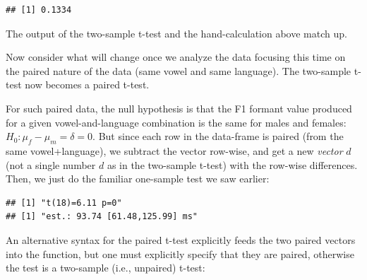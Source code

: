 \documentclass[
  12pt,
]{krantz}
\newenvironment{Shaded}{\begin{snugshade}}{\end{snugshade}}
\newcommand{\AttributeTok}[1]{\textcolor[rgb]{0.77,0.63,0.00}{#1}}
\newcommand{\ConstantTok}[1]{\textcolor[rgb]{0.00,0.00,0.00}{#1}}
\newcommand{\FunctionTok}[1]{\textcolor[rgb]{0.00,0.00,0.00}{#1}}
\newcommand{\NormalTok}[1]{#1}
\newcommand{\OtherTok}[1]{\textcolor[rgb]{0.56,0.35,0.01}{#1}}
\newcommand{\SpecialCharTok}[1]{\textcolor[rgb]{0.00,0.00,0.00}{#1}}
\theoremstyle{definition}
\theoremstyle{definition}
\theoremstyle{definition}
\theoremstyle{definition}
\theoremstyle{remark}
\begin{document}
\begin{verbatim}
## [1] 0.1334
\end{verbatim}

The output of the two-sample t-test and the hand-calculation above match up.

Now consider what will change once we analyze the data focusing this time on the paired nature of the data (same vowel and same language). The two-sample t-test now becomes a paired t-test.

For such paired data, the null hypothesis is that the F1 formant value produced for a given vowel-and-language combination is the same for males and females: \(H_0: \mu_f-\mu_m=\delta=0\). But since each row in the data-frame is paired (from the same vowel+language), we subtract the vector row-wise, and get a new \emph{vector} \(d\) (not a single number \(d\) as in the two-sample t-test) with the row-wise differences. Then, we just do the familiar one-sample test we saw earlier:

\begin{Shaded}
\end{Shaded}

\begin{verbatim}
## [1] "t(18)=6.11 p=0"
## [1] "est.: 93.74 [61.48,125.99] ms"
\end{verbatim}

An alternative syntax for the paired t-test explicitly feeds the two paired vectors into the function, but one must explicitly specify that they are paired, otherwise the test is a two-sample (i.e., unpaired) t-test:

\begin{Shaded}
\end{Shaded}
\end{document}
